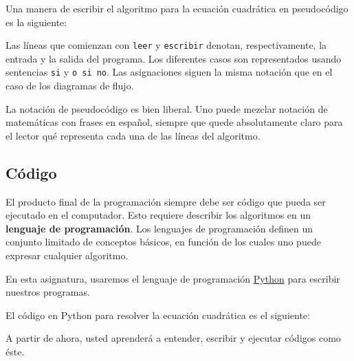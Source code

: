 Una manera de escribir el algoritmo para la ecuación cuadrática en
pseudocódigo es la siguiente:

%
%
%
%

Las líneas que comienzan con \lstinline!leer! y \lstinline!escribir!
denotan, respectivamente, la entrada y la salida del programa. Los
diferentes casos son representados usando sentencias \lstinline!si! y
\lstinline!o si no!. Las asignaciones siguen la misma notación que en el
caso de los diagramas de flujo.

La notación de pseudocódigo es bien liberal. Uno puede mezclar notación
de matemáticas con frases en español, siempre que quede absolutamente
claro para el lector qué representa cada una de las líneas del
algoritmo.

\subsection{Código}

El producto final de la programación siempre debe ser código que pueda
ser ejecutado en el computador. Esto requiere describir los algoritmos
en un \textbf{lenguaje de programación}. Los lenguajes de programación
definen un conjunto limitado de conceptos básicos, en función de los
cuales uno puede expresar cualquier algoritmo.

En esta asignatura, usaremos el lenguaje de programación
\href{http://python.org/}{Python} para escribir nuestros programas.

El código en Python para resolver la ecuación cuadrática es el
siguiente:

A partir de ahora, usted aprenderá a entender, escribir y ejecutar
códigos como éste.
